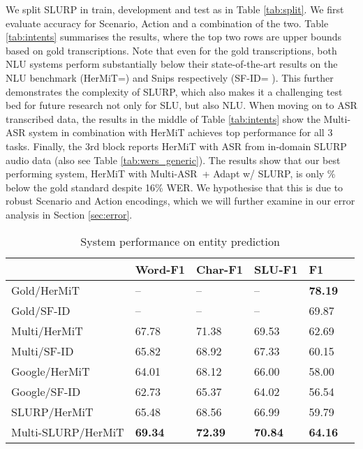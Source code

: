 \documentclass[11pt,a4paper]{article}
\newcommand{\metricname}{SLU-F1}
\newcommand{\levm}{Char-F1}
\newcommand{\datasetacr}{SLURP}
\newcommand{\hermit}{HerMiT}
\newcommand{\sfid}{SF-ID}
\newcommand{\masr}{Multi-ASR}
\begin{document}
We split SLURP in train, development and test as in Table \ref{tab:split}.
We first evaluate accuracy for Scenario, Action and a combination of the two.
Table \ref{tab:intents} summarises the results, where the top two rows are upper bounds based on gold transcriptions.  
Note that even for the gold transcriptions, both NLU systems perform substantially below their state-of-the-art results on the NLU benchmark (\hermit=) and Snips respectively (\sfid = ). This further demonstrates the complexity of \datasetacr, which also makes it a challenging test bed for future research not only for SLU, but also NLU.
When moving on to ASR transcribed data, the results in the middle of Table \ref{tab:intents}
 show the \masr{} system in combination with \hermit{} achieves top performance for all 3 tasks. Finally, the 3rd block reports  \hermit{} with ASR from in-domain SLURP audio data (also see Table \ref{tab:wers_generic}).
 The results show that our best performing system, \hermit{} with
 \masr~+ Adapt w/ \datasetacr, is only \% below the gold standard despite 16\% WER.
We hypothesise that this is due to robust Scenario and Action encodings, which we will further examine in our error analysis in Section \ref{sec:error}.




\begin{table}[t]
	\centering
	\footnotesize
\begin{tabular}{l|p{0.8cm}p{0.8cm}p{0.8cm}p{0.8cm}p{0.8cm}}
	\toprule
	& \textbf{Word-F1} & \textbf{\levm} & \textbf{\metricname} & \textbf{F1} \\
	\midrule
	Gold/\hermit & -- & --  & -- & {\bf 78.19} \\
	Gold/\sfid & -- & -- & -- & 69.87 \\
	\midrule
    Multi/\hermit & 67.78 & 71.38 & 69.53 & 62.69 \\
    Multi/\sfid & 65.82 & 68.92 & 67.33  & 60.15 \\
    Google/\hermit & 64.01 & 68.12 & 66.00 & 58.00\\
    Google/\sfid & 62.73 & 65.37 & 64.02 & 56.54\\
    \midrule SLURP/\hermit & 65.48 & 68.56 & 66.99 & 59.79 \\
    {\scriptsize Multi-SLURP/\hermit} & \bf 69.34 &  \bf 72.39 & \bf 70.84 &  \bf 64.16 \\
    \bottomrule
\end{tabular}
	\caption{System performance on entity prediction} \label{tab:entities}
\end{table}
\end{document}
